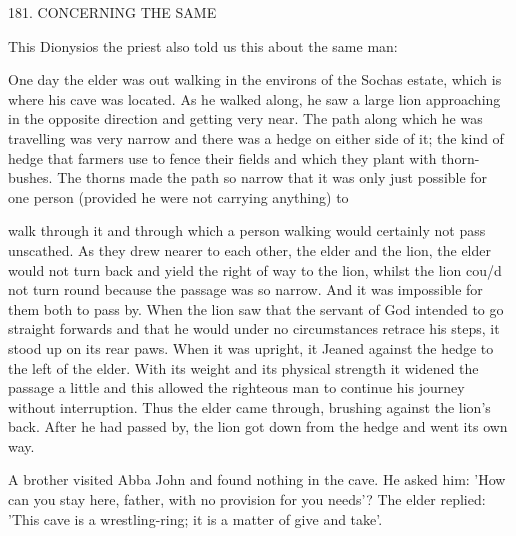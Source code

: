 181.
CONCERNING THE SAME

This Dionysios the priest also told us this about the same man:

One day the elder was out walking in the environs of the Sochas
estate, which is where his cave was located.
As he walked along, he
saw a large lion approaching in the opposite direction and getting
very near.
The path along which he was travelling was very narrow
and there was a hedge on either side of it; the kind of hedge that
farmers use to fence their fields and which they plant with thorn-
bushes.
The thorns made the path so narrow that it was only just
possible for one person (provided he were not carrying anything) to

walk through it and through which a person walking would
certainly not pass unscathed.
As they drew nearer to each other, the
elder and the lion, the elder would not turn back and yield the right
of way to the lion, whilst the lion cou/d not turn round because the
passage was so narrow.
And it was impossible for them both to pass
by.
When the lion saw that the servant of God intended to go
straight forwards and that he would under no circumstances retrace
his steps, it stood up on its rear paws.
When it was upright, it
Jeaned against the hedge to the left of the elder.
With its weight and
its physical strength it widened the passage a little and this allowed
the righteous man to continue his journey without interruption.
Thus the elder came through, brushing against the lion's back.
After
he had passed by, the lion got down from the hedge and went its
own way.

A brother visited Abba John and found nothing in the cave.
He
asked him: 'How can you stay here, father, with no provision for
you needs'? The elder replied: 'This cave is a wrestling-ring; it is a
matter of give and take'.

